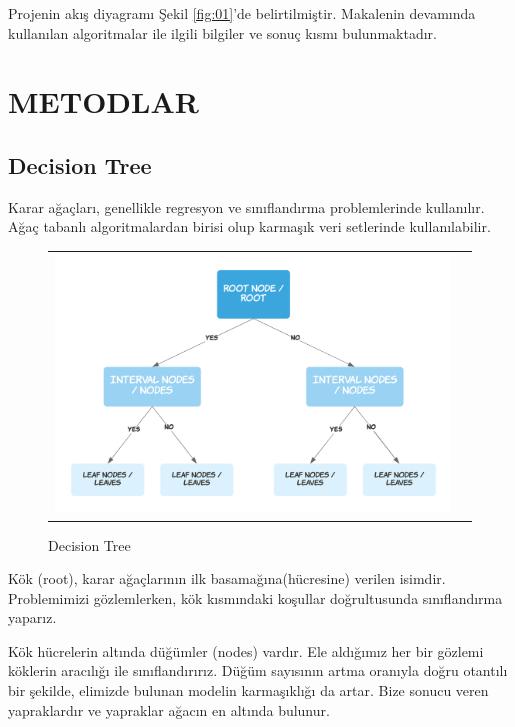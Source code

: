 \documentclass[conference]{IEEEtran}
\begin{document}
Projenin akış diyagramı Şekil \ref{fig:01}'de belirtilmiştir. Makalenin devamında kullanılan algoritmalar ile ilgili bilgiler ve sonuç kısmı bulunmaktadır.

\pagebreak
\section{\textbf{METODLAR}}
\subsection{\textbf{Decision Tree}}

\quad 	Karar ağaçları, genellikle regresyon ve sınıflandırma problemlerinde kullanılır. Ağaç tabanlı algoritmalardan birisi olup karmaşık veri setlerinde kullanılabilir\cite{4}.

\begin{figure}[!h]
	\centering
	\begin{center}
		\begin{tabular}{cc}
			\includegraphics[scale=0.225]{pictures/pic_02.png}&
		\end{tabular}
	\end{center}
	\caption{Decision Tree}
	\label{fig:02}
\end{figure}

\quad Kök (root), karar ağaçlarının ilk basamağına(hücresine) verilen isimdir. Problemimizi gözlemlerken, kök kısmındaki koşullar doğrultusunda sınıflandırma yaparız.

\quad Kök hücrelerin altında düğümler (nodes) vardır. Ele aldığımız her bir gözlemi köklerin aracılığı ile sınıflandırırız. Düğüm sayısının artma oranıyla doğru otantılı bir şekilde, elimizde bulunan modelin karmaşıklığı da artar. Bize sonucu veren yapraklardır ve yapraklar ağacın en altında bulunur\cite{4}.
\end{document}
